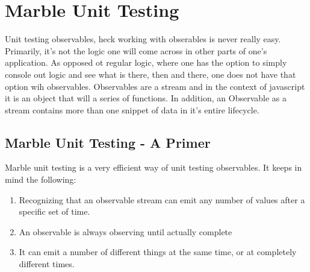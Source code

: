 \maketitle{}
\section{ Marble Unit Testing }

Unit testing observables, heck working with obserables is never really easy.
Primarily, it's not the logic one will come across in other parts of one's
application. As opposed ot regular logic, where one has the option to simply
console out logic and see what is there, then and there, one does not have that
option wih observables. Observables are a stream and in the context of
javascript it is an object that will a series of functions. In addition, an
Observable as a stream contains more than one snippet of data in it's entire
lifecycle.

\subsection{ Marble Unit Testing - A Primer }
Marble unit testing is a very efficient way of unit testing observables. It
keeps in mind the following:
\begin{enumerate}
  \item Recognizing that an observable stream can emit any number of values
  after a specific set of time.
  \item An observable is always observing until actually complete
  \item It can emit a number of different things at the same time, or at
  completely different times. 
\end{enumerate}
